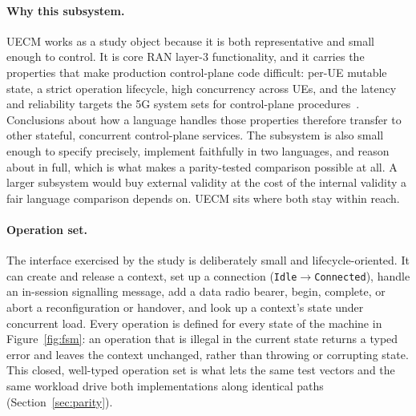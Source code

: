 \documentclass[english,twoside,openright,a4paper,censored,csm,software-track-2020]{HYthesisML}
\begin{document}
\paragraph{Why this subsystem.}
UECM works as a study object because it is both representative and small enough to control. It
is core RAN layer-3 functionality, and it carries the properties that make production
control-plane code difficult: per-UE mutable state, a strict operation lifecycle, high
concurrency across UEs, and the latency and reliability targets the 5G system sets for
control-plane procedures~\cite{3gpp38913,3gpp22261}. Conclusions about how a language handles
those properties therefore transfer to other stateful, concurrent control-plane services. The
subsystem is also small enough to specify precisely, implement faithfully in two languages, and
reason about in full, which is what makes a parity-tested comparison possible at all. A larger
subsystem would buy external validity at the cost of the internal validity a fair language
comparison depends on. UECM sits where both stay within reach.

\paragraph{Operation set.}
The interface exercised by the study is deliberately small and lifecycle-oriented. It can create
and release a context, set up a connection (\texttt{Idle}$\rightarrow$\texttt{Connected}), handle
an in-session signalling message, add a data radio bearer, begin, complete, or abort a
reconfiguration or handover, and look up a context's state under concurrent load. Every operation is
defined for every state of the machine in Figure~\ref{fig:fsm}: an operation that is illegal in
the current state returns a typed error and leaves the context unchanged, rather than throwing
or corrupting state. This closed, well-typed operation set is what lets the same test vectors
and the same workload drive both implementations along identical paths
(Section~\ref{sec:parity}).
\end{document}
